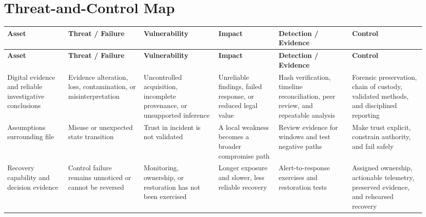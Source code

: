 \documentclass[11pt,letterpaper]{article}
\begin{document}
\section*{Threat-and-Control Map}
\begingroup\scriptsize\setlength{\tabcolsep}{2pt}
\begin{longtable}{>{\raggedright\arraybackslash}p{}>{\raggedright\arraybackslash}p{}>{\raggedright\arraybackslash}p{}>{\raggedright\arraybackslash}p{}>{\raggedright\arraybackslash}p{}>{\raggedright\arraybackslash}p{}}
\toprule\rowcolor{Navy}\color{white}\textbf{Asset} & \color{white}\textbf{Threat / Failure} & \color{white}\textbf{Vulnerability} & \color{white}\textbf{Impact} & \color{white}\textbf{Detection / Evidence} & \color{white}\textbf{Control}\\\midrule
\endfirsthead
\toprule\rowcolor{Navy}\color{white}\textbf{Asset} & \color{white}\textbf{Threat / Failure} & \color{white}\textbf{Vulnerability} & \color{white}\textbf{Impact} & \color{white}\textbf{Detection / Evidence} & \color{white}\textbf{Control}\\\midrule
\endhead
Digital evidence and reliable investigative conclusions & Evidence alteration, loss, contamination, or misinterpretation & Uncontrolled acquisition, incomplete provenance, or unsupported inference & Unreliable findings, failed response, or reduced legal value & Hash verification, timeline reconciliation, peer review, and repeatable analysis & Forensic preservation, chain of custody, validated methods, and disciplined reporting\\\midrule
Assumptions surrounding file & Misuse or unexpected state transition & Trust in incident is not validated & A local weakness becomes a broader compromise path & Review evidence for windows and test negative paths & Make trust explicit, constrain authority, and fail safely\\\midrule
Recovery capability and decision evidence & Control failure remains unnoticed or cannot be reversed & Monitoring, ownership, or restoration has not been exercised & Longer exposure and slower, less reliable recovery & Alert-to-response exercises and restoration tests & Assigned ownership, actionable telemetry, preserved evidence, and rehearsed recovery\\\midrule
\bottomrule
\end{longtable}
\endgroup
\end{document}
